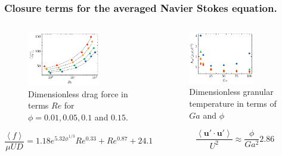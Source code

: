 \documentclass{sintefbeamer}
\newcommand{\avg}[1]{\left<#1\right>}
\begin{document}
\begin{frame}
  \frametitle{Closure terms for the averaged Navier Stokes equation.}
\begin{columns}
  \begin{column}{0.5\textwidth}
    \begin{figure}
      \includegraphics[width=0.7\textwidth]{image/HOMOGENEOUS/fCA/FH_mu_Re.pdf}
      \caption{Dimensionless drag force in terms $Re$ for $\phi = 0.01, 0.05, 0.1$ and $0.15$.}
    \end{figure}
    \begin{equation*}
      \frac{\avg{f}}{\mu UD} 
      = 1.18 e^{5.32\phi^{1/3}}  Re^{0.33}  + Re^{0.87} +24.12
    \end{equation*}
  \end{column}
  \begin{column}{0.5\textwidth}
    \begin{figure}[h!]
      \centering
      \includegraphics[width=0.7\textwidth]{image/HOMOGENEOUS/fPA/Talpha.pdf}
      \caption{Dimensionless granular temperature in terms of $Ga$ and $\phi$}
  \end{figure}
  	\begin{equation}
    \frac{\avg{\textbf{u}'\cdot \textbf{u}'}}{U^2}  
    \approx \frac{\phi}{Ga^2} 2.86 
    \label{eq:Talpha_scaling}
	\end{equation}
  \end{column}
\end{columns}


\end{frame}
\end{document}

